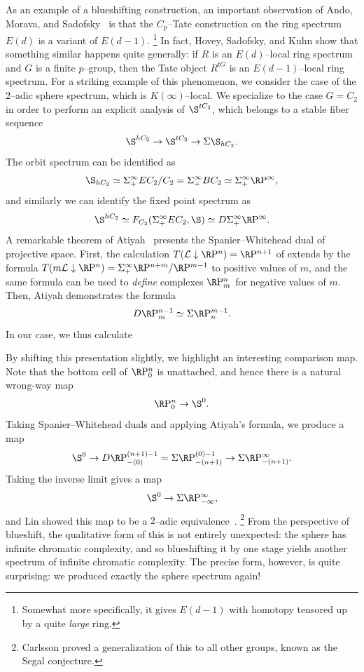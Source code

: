 As an example of a blueshifting construction, an important observation of Ando, Morava, and Sadofsky~\cite{AMS} is that the \(C_p\)--Tate construction on the ring spectrum \(E(d)\) is a variant of \(E(d-1)\).%
\footnote{%
Somewhat more specifically, it gives \(E(d-1)\) with homotopy tensored up by a quite \emph{large} ring.
}
In fact, Hovey, Sadofsky, and Kuhn show that something similar happens quite generally: if \(R\) is an \(E(d)\)--local ring spectrum and \(G\) is a finite \(p\)--group, then the Tate object \(R^{tG}\) is an \(E(d-1)\)--local ring spectrum.
For a striking example of this phenomenon, we consider the case of the \(2\)--adic sphere spectrum, which is \(K(\infty)\)--local.
We specialize to the case \(G = C_2\) in order to perform an explicit analysis of \(\S^{tC_2}\), which belongs to a stable fiber sequence \[\S^{hC_2} \to \S^{tC_2} \to \Susp \S_{hC_2}.\]
The orbit spectrum can be identified as \[\S_{hC_2} \simeq \Susp^\infty_+ EC_2 / C_2 = \Susp^\infty_+ BC_2 \simeq \Susp^\infty_+ \RP^\infty,\] and similarly we can identify the fixed point spectrum as \[\S^{hC_2} \simeq F_{C_2}(\Susp^\infty_+ EC_2, \S) \simeq D\Susp^\infty_+ \RP^\infty.\]
A remarkable theorem of Atiyah~\cite{Atiyah} presents the Spanier--Whitehead dual of projective space.
First, the calculation \(T(\mathcal L \downarrow \RP^n) = \RP^{n+1}\) of  extends by the formula \(T(m \mathcal L \downarrow \RP^n) = \Susp^\infty_+ \RP^{n+m} / \RP^{m-1}\) to positive values of \(m\), and the same formula can be used to \emph{define} complexes \(\RP^n_m\) for negative values of \(m\).
Then, Atiyah demonstrates the formula \[D \RP^{n-1}_m \simeq \Susp \RP^{m-1}_n.\]
In our case, we thus calculate
\begin{center}
\end{center}
By shifting this presentation slightly, we highlight an interesting comparison map.
Note that the bottom cell of \(\RP^n_0\) is unattached, and hence there is a natural wrong-way map \[\RP^n_0 \to \S^0.\]
Taking Spanier--Whitehead duals and applying Atiyah's formula, we produce a map \[\S^0 \to D \RP^{(n+1)-1}_{-(0)} = \Susp \RP^{(0)-1}_{-(n+1)} \to \Susp \RP^\infty_{-(n+1)}.\]
Taking the inverse limit gives a map \[\S^0 \to \Susp \RP^\infty_{-\infty},\] and Lin showed this map to be a \(2\)--adic equivalence~\cite{Lin}.%
\footnote{%
Carlsson proved a generalization of this to all other groups, known as the Segal conjecture.
}
From the perspective of blueshift, the qualitative form of this is not entirely unexpected: the sphere has infinite chromatic complexity, and so blueshifting it by one stage yields another spectrum of infinite chromatic complexity.
The precise form, however, is quite surprising: we produced exactly the sphere spectrum again!

